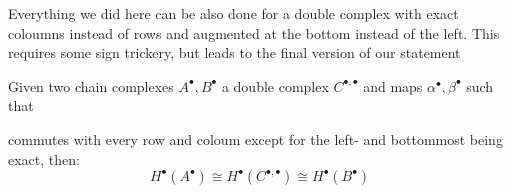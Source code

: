 Everything we did here can be also done for a double complex with exact
coloumns instead of rows and augmented at the bottom instead of the left.
This requires some sign trickery, but leads to the final version of our
statement
\begin{corolarry}
Given two chain complexes $A^\bullet, B^\bullet$ a double complex
$C^{\bullet,\bullet}$ and maps $\alpha^\bullet, \beta^\bullet$ such that
\begin{center}
\end{center}
commutes with every row and coloum except for the left- and bottommost
being exact, then:
\[
	H^\bullet(A^\bullet)
		\cong H^\bullet(C^{\bullet, \bullet})	
		\cong H^\bullet(B^\bullet)
\]

\end{corolarry}
